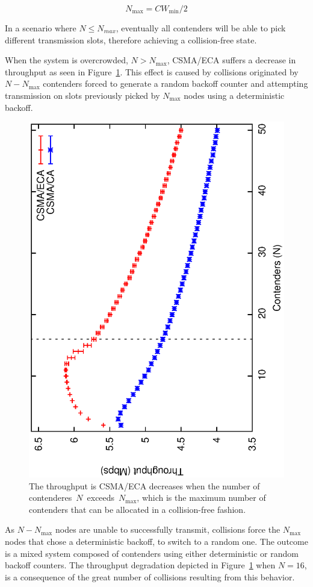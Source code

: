 \begin{equation} \label{eq:capacity}	
	N_{\max} = CW_{\min}/2
\end{equation}

In a scenario where $N\leq N_{max}$, eventually all contenders will be able to pick different transmission slots, therefore achieving a collision-free state.

When the system is overcrowded, $N>N_{\max}$, CSMA/ECA suffers a decrease in throughput as seen in Figure~\ref{fig:throughput}. This effect is caused by collisions originated by $N-N_{\max}$ contenders forced to generate a random backoff counter and attempting transmission on slots previously picked by $N_{\max}$ nodes using a deterministic backoff.


\begin{figure}[htbp]
  \centering
  \includegraphics[width=0.7\linewidth, angle = -90]{figures/errorPlots/ECA-vs-CA-fixed.eps}
  \caption{The throughput is CSMA/ECA decreases when the number of contenderes~$N$~exceeds~$N_{\max}$, which is the maximum number of contenders that can be allocated in a collision-free fashion.
  \label{fig:throughput}}
\end{figure}

As $N-N_{\max}$ nodes are unable to successfully transmit, collisions force the $N_{\max}$ nodes that chose a deterministic backoff, to switch to a random one. The outcome is a mixed system composed of contenders using either deterministic or random backoff counters. The throughput degradation depicted in Figure~\ref{fig:throughput} when $N=16$, is a consequence of the great number of collisions resulting from this behavior.